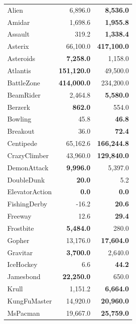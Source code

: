 \begin{table}[ht]
\begin{center}
\begin{small}
\begin{tabular}{lrr}
Alien          & 6,896.0            & \textbf{8,536.0}   \\
Amidar         & 1,698.6            & \textbf{1,955.8}   \\
Assault        & 319.2              & \textbf{1,338.4}   \\
Asterix        & 66,100.0           & \textbf{417,100.0} \\
Asteroids      & \textbf{7,258.0}   & 1,158.0            \\
Atlantis       & \textbf{151,120.0} & 49,500.0           \\
BattleZone     & \textbf{414,000.0} & 234,200.0          \\
BeamRider      & 2,464.8            & \textbf{5,580.0}   \\
Berzerk        & \textbf{862.0}     & 554.0              \\
Bowling        & 45.8               & \textbf{46.8}      \\
Breakout       & 36.0               & \textbf{72.4}      \\
Centipede      & 65,162.6           & \textbf{166,244.8} \\
CrazyClimber   & 43,960.0           & \textbf{129,840.0} \\
DemonAttack    & \textbf{9,996.0}   & 5,397.0            \\
DoubleDunk     & \textbf{20.0}      & 5.2                \\
ElevatorAction & \textbf{0.0}       & \textbf{0.0}       \\
FishingDerby   & -16.2              & \textbf{20.6}      \\
Freeway        & 12.6               & \textbf{29.4}      \\
Frostbite      & \textbf{5,484.0}   & 280.0              \\
Gopher         & 13,176.0           & \textbf{17,604.0}  \\
Gravitar       & \textbf{3,700.0}   & 2,640.0            \\
IceHockey      & 6.6                & \textbf{44.2}      \\
Jamesbond      & \textbf{22,250.0}  & 650.0              \\
Krull          & 1,151.2            & \textbf{6,664.0}   \\
KungFuMaster   & 14,920.0           & \textbf{20,960.0}  \\
MsPacman       & 19,667.0           & \textbf{25,759.0}  \\

\end{tabular}
\end{small}
\end{center}
\end{table}
